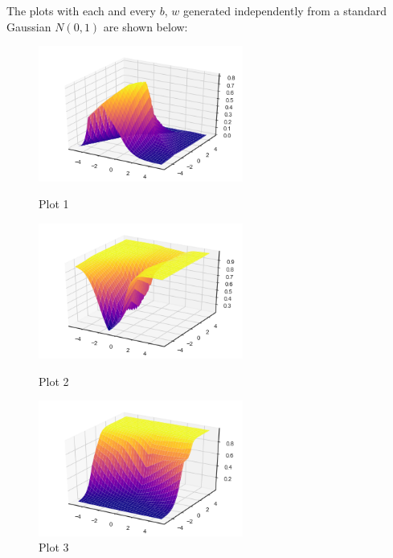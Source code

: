 \documentclass[a4paper]{article}
\theoremstyle{definition}
\newenvironment{soln}{
    \leavevmode\color{blue}\ignorespaces
}{}
\begin{document}
\begin{enumerate}
\begin{soln}
The plots with each and every $b$, $w$ generated independently from a standard Gaussian $N(0,1)$ are shown below:

\begin{figure}[h!]
	        \centering
	        \includegraphics[width=0.6\textwidth]{Q2/Img1.png} 
	        \captionsetup{labelformat=empty}
	        \caption{Plot 1}



	        \includegraphics[width=0.6\textwidth]{Q2/Img2.png} 
	        \captionsetup{labelformat=empty}
	        \caption{Plot 2}


	        \centering
	        \includegraphics[width=0.6\textwidth]{Q2/Img3.png} 
	        \captionsetup{labelformat=empty}
	        \caption{Plot 3}
\end{figure}


\end{soln}
\end{enumerate}
\end{document}
